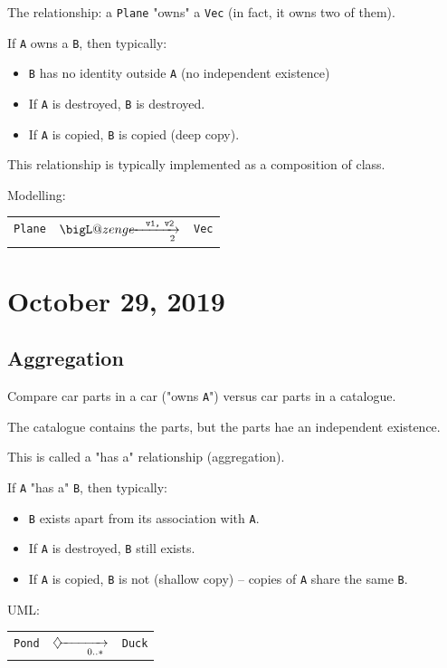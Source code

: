 \documentclass[11pt]{article}
\makeatletter
\theoremstyle{definition}
\newcommand\bigLozenge{\mathop{\mathpalette\bigL@zenge\relax}}
\newcommand\bigL@zenge[2]{%
  \vcenter{\hbox{\m@th
    \scalebox{\ifx#1\displaystyle 2\else1.2\fi}{$#1\blacklozenge$}%
  }}%
}
\makeatother
\begin{document}
The relationship: a {\tt Plane} "owns" a {\tt Vec} (in fact, it owns two of them).

If {\tt A} owns a {\tt B}, then typically: \vspace{-0.25cm}
\begin{itemize}
    \item {\tt B} has no identity outside {\tt A} (no independent existence)
    \item If {\tt A} is destroyed, {\tt B} is destroyed.
    \item If {\tt A} is copied, {\tt B} is copied (deep copy).
\end{itemize}
This relationship is typically implemented as a composition of class.

Modelling:
\begin{table}[h]
\centering
\begin{tabular}{|l|l|l|}
\cline{1-1} \cline{3-3}
{\tt Plane} & $\bigLozenge\hspace{-0.25cm}\xrightarrow[\quad\quad\quad 2]{\quad{\text{\tt v1, v2}}}$ & {\tt Vec} \\ \cline{1-1} \cline{3-3} 
\end{tabular}
\end{table}
\newpage

\section{October 29, 2019}

\subsection{Aggregation}
Compare car parts in a car ("owns {\tt A}") versus car parts in a catalogue.

The catalogue contains the parts, but the parts hae an independent existence.

This is called a "has a" relationship (aggregation).

If {\tt A} "has a" {\tt B}, then typically:\vspace{-0.25cm}
\begin{itemize}
    \item {\tt B} exists apart from its association with {\tt A}.
    \item If {\tt A} is destroyed, {\tt B} still exists.
    \item If {\tt A} is copied, {\tt B} is not (shallow copy) -- copies of {\tt A} share the same {\tt B}.
\end{itemize}
\vspace{-0.25cm}
UML:
\begin{table}[h]
\centering
\begin{tabular}{|l|l|l|}
\cline{1-1} \cline{3-3}
{\tt Pond} & $\diamondsuit\hspace{-0.20cm}\xrightarrow[\quad\quad 0..*]{}$ & {\tt Duck} \\ \cline{1-1} \cline{3-3} 
\end{tabular}
\end{table}
\end{document}
